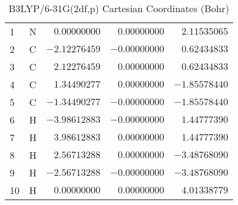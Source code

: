 \documentclass[10pt,oneside]{article}
\begin{document}
\begin{table}[h]
\centering
\caption{B3LYP/6-31G(2df,p) Cartesian Coordinates (Bohr)}
\begin{tabular}{llrrr}
\toprule
1  & N  & $ 0.00000000$ & $ 0.00000000$ & $ 2.11535065$ \\
2  & C  & $-2.12276459$ & $-0.00000000$ & $ 0.62434833$ \\
3  & C  & $ 2.12276459$ & $ 0.00000000$ & $ 0.62434833$ \\
4  & C  & $ 1.34490277$ & $ 0.00000000$ & $-1.85578440$ \\
5  & C  & $-1.34490277$ & $-0.00000000$ & $-1.85578440$ \\
6  & H  & $-3.98612883$ & $-0.00000000$ & $ 1.44777390$ \\
7  & H  & $ 3.98612883$ & $ 0.00000000$ & $ 1.44777390$ \\
8  & H  & $ 2.56713288$ & $ 0.00000000$ & $-3.48768090$ \\
9  & H  & $-2.56713288$ & $-0.00000000$ & $-3.48768090$ \\
10 & H  & $ 0.00000000$ & $ 0.00000000$ & $ 4.01338779$ \\
\bottomrule
\end{tabular}
\end{table}
\end{document}
